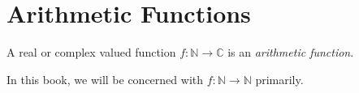 \documentclass[elemannt.tex]{subfile}
\begin{document}
	\chapter{Arithmetic Functions}
		\begin{definition}
			A real or complex valued function $f:\mathbb{N}\to\mathbb{C}$ is an \textit{arithmetic function}.
		\end{definition}
	In this book, we will be concerned with $f:\mathbb{N}\to\mathbb{N}$ primarily.
\end{document}

